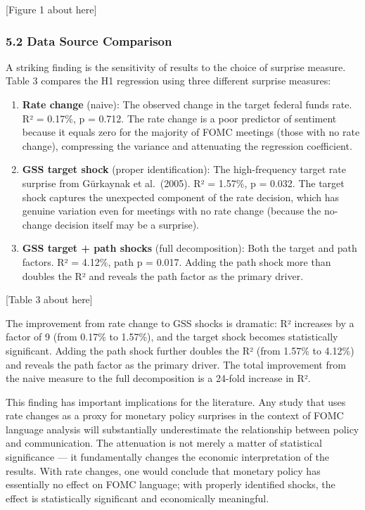 \documentclass[12pt]{article}
\begin{document}
{[}Figure 1 about here{]}

\subsubsection{5.2 Data Source Comparison}\label{data-source-comparison}

A striking finding is the sensitivity of results to the choice of
surprise measure. Table 3 compares the H1 regression using three
different surprise measures:

\begin{enumerate}
\def\labelenumi{\arabic{enumi}.}
\item
  \textbf{Rate change} (naive): The observed change in the target
  federal funds rate. R² = 0.17\%, p = 0.712. The rate change is a poor
  predictor of sentiment because it equals zero for the majority of FOMC
  meetings (those with no rate change), compressing the variance and
  attenuating the regression coefficient.
\item
  \textbf{GSS target shock} (proper identification): The high-frequency
  target rate surprise from Gürkaynak et al.~(2005). R² = 1.57\%, p =
  0.032. The target shock captures the unexpected component of the rate
  decision, which has genuine variation even for meetings with no rate
  change (because the no-change decision itself may be a surprise).
\item
  \textbf{GSS target + path shocks} (full decomposition): Both the
  target and path factors. R² = 4.12\%, path p = 0.017. Adding the path
  shock more than doubles the R² and reveals the path factor as the
  primary driver.
\end{enumerate}

{[}Table 3 about here{]}

The improvement from rate change to GSS shocks is dramatic: R² increases
by a factor of 9 (from 0.17\% to 1.57\%), and the target shock becomes
statistically significant. Adding the path shock further doubles the R²
(from 1.57\% to 4.12\%) and reveals the path factor as the primary
driver. The total improvement from the naive measure to the full
decomposition is a 24-fold increase in R².

This finding has important implications for the literature. Any study
that uses rate changes as a proxy for monetary policy surprises in the
context of FOMC language analysis will substantially underestimate the
relationship between policy and communication. The attenuation is not
merely a matter of statistical significance --- it fundamentally changes
the economic interpretation of the results. With rate changes, one would
conclude that monetary policy has essentially no effect on FOMC
language; with properly identified shocks, the effect is statistically
significant and economically meaningful.
\end{document}
